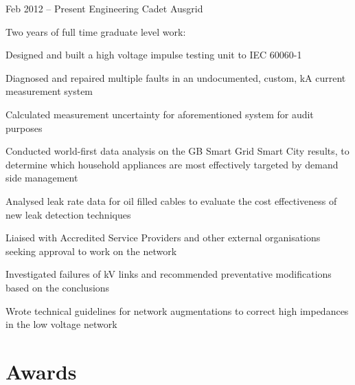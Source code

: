 \documentclass[a4paper]{friggeri-cv} %
\begin{document}
\entry
{Feb 2012 -- Present}
{Engineering Cadet}
{Ausgrid}
{
Two years of full time graduate level work:

\begin{itemize*}
   \item Designed and built a high voltage impulse testing unit to IEC 60060-1
   \item Diagnosed and repaired multiple faults in an undocumented, custom, \unit[100]{kA} current measurement system
   \item Calculated measurement uncertainty for aforementioned system for audit purposes
   \item Conducted world-first data analysis on the \unit[20]{GB} Smart Grid Smart City results, to determine which household appliances are most effectively targeted by demand side management
   \item Analysed leak rate data for oil filled cables to evaluate the cost effectiveness of new leak detection techniques
   \item Liaised with Accredited Service Providers and other external organisations seeking approval to work on the network
   \item Investigated failures of \unit[33]{kV} links and recommended preventative modifications based on the conclusions
   \item Wrote technical guidelines for network augmentations to correct high impedances in the low voltage network
\end{itemize*}

}





\section{Awards}
\end{document}
